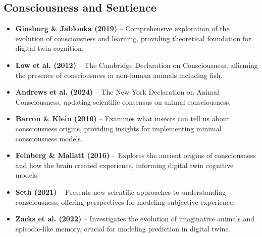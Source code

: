 \documentclass[11pt,a4paper]{article}
\begin{document}
\subsection*{Consciousness and Sentience}
\begin{itemize}
    \item \textbf{Ginsburg \& Jablonka (2019)} \cite{ginsburg2019evolution} -- Comprehensive exploration of the evolution of consciousness and learning, providing theoretical foundation for digital twin cognition.
    
    \item \textbf{Low et al. (2012)} \cite{low2012cambridge} -- The Cambridge Declaration on Consciousness, affirming the presence of consciousness in non-human animals including fish.
    
    \item \textbf{Andrews et al. (2024)} \cite{andrews2024nydeclaration} -- The New York Declaration on Animal Consciousness, updating scientific consensus on animal consciousness.
    
    \item \textbf{Barron \& Klein (2016)} \cite{barron2016neural} -- Examines what insects can tell us about consciousness origins, providing insights for implementing minimal consciousness models.
    
    \item \textbf{Feinberg \& Mallatt (2016)} \cite{feinberg2016ancient} -- Explores the ancient origins of consciousness and how the brain created experience, informing digital twin cognitive models.
    
    \item \textbf{Seth (2021)} \cite{seth2021being} -- Presents new scientific approaches to understanding consciousness, offering perspectives for modeling subjective experience.
    
    \item \textbf{Zacks et al. (2022)} \cite{zacks2022futures} -- Investigates the evolution of imaginative animals and episodic-like memory, crucial for modeling prediction in digital twins.
\end{itemize}
\end{document}
